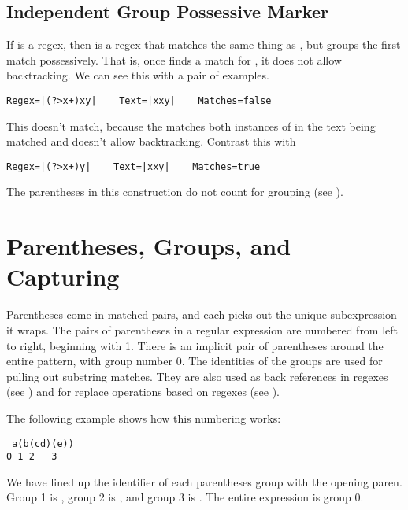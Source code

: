 \subsection{Independent Group Possessive Marker}\label{section:group-possess-marker}

If  is a regex, then  is a regex that
matches the same thing as , but groups the first match
possessively.  That is, once  finds a match
for , it does not allow backtracking.   We can see this
with a pair of examples.
%
\begin{verbatim}
Regex=|(?>x+)xy|    Text=|xxy|    Matches=false
\end{verbatim}
%
This doesn't match, because the  matches both
instances of  in the text being matched and doesn't
allow backtracking.  Contrast this with
%
\begin{verbatim}
Regex=|(?>x+)y|    Text=|xxy|    Matches=true
\end{verbatim}

The parentheses in this construction do not count for grouping
(see ).


\section{Parentheses, Groups, and Capturing}\label{section:regex-groups}

Parentheses come in matched pairs, and
each picks out the unique subexpression  it wraps.
The pairs of parentheses in a regular expression are numbered
from left to right, beginning with 1. 
There is an implicit pair of parentheses around the entire pattern, 
with group number 0.  
The identities of the groups are used for pulling out substring matches.
They are also used as back references in regexes (see
) and for replace operations
based on regexes (see
). 

The following example shows how this numbering works:
%
\begin{verbatim}
 a(b(cd)(e))
0 1 2   3
\end{verbatim}
%
We have lined up the identifier of each parentheses group with the opening paren.
Group 1 is ,
group 2 is , and group 3 is .  
The entire expression is group 0.

